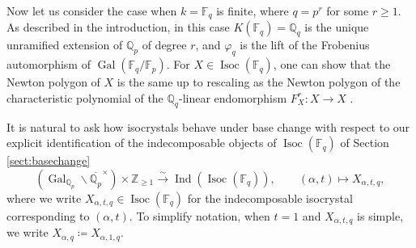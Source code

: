 \documentclass[10pt, reqno, hidelinks]{amsart}
\DeclareMathOperator{\Isoc}{Isoc}
\DeclareMathOperator{\Gal}{Gal}
\DeclareMathOperator{\Ind}{Ind}
\newcommand{\bF}{{\mathbb F}}
\newcommand{\bQ}{{\mathbb Q}}
\newcommand{\bZ}{{\mathbb Z}}
\numberwithin{thm}{subsection}
\theoremstyle{definition}
\begin{document}
Now let us consider the case when $k = \bF_q$ is finite, where $q = p^r$ for some $r \geq 1$. As described in the introduction, in this case $K(\bF_q) = \bQ_q$ is the unique unramified extension of $\bQ_p$ of degree $r$, and $\varphi_q$ is the lift of the Frobenius automorphism of $\Gal(\bF_q / \bF_p)$. For $X \in \Isoc(\bF_q)$, one can show that the Newton polygon of $X$ is the same up to rescaling as the Newton polygon of the characteristic polynomial of the $\bQ_q$-linear endomorphism $F_X^r \colon X \rightarrow X$ \cite[Chap.\ IV, \S 6]{Dem}.

It is natural to ask how isocrystals behave under base change with respect to our explicit identification of the indecomposable objects of $\Isoc(\bF_q)$ of Section \ref{sect:basechange}
\[
(\Gal_{\bQ_p} \!\! \backslash \overline{\bQ_p}^{\times}) \times \bZ_{\geq 1} \xrightarrow{\sim} \Ind(\Isoc(\bF_q)), \qquad (\alpha, t) \mapsto X_{\alpha, t, q},
\]
where we write $X_{\alpha, t, q} \in \Isoc(\bF_q)$ for the indecomposable isocrystal corresponding to $(\alpha, t)$. To simplify notation, when $t = 1$ and $X_{\alpha, t, q}$ is simple, we write $X_{\alpha, q} \coloneqq X_{\alpha, 1, q}$.
\end{document}
